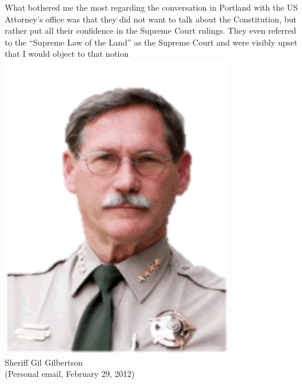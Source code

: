\begin{frame}
    \begin{columns}[onlytextwidth]
What bothered me the most regarding the conversation in Portland with the US
Attorney's office was that they did not want to talk about the Constitution,
but rather put all their confidence in the Supreme Court rulings. They even
referred to the ``Supreme Law of the Land'' as the Supreme Court and were visibly
upset that I would object to that notion
            \centering
            \includegraphics[width=0.75\textwidth]{img/gil-gilbertson.png}
            \\ Sheriff Gil Gilbertson
            \\ (Personal email, February 29, 2012)
    \end{columns}
\end{frame}

